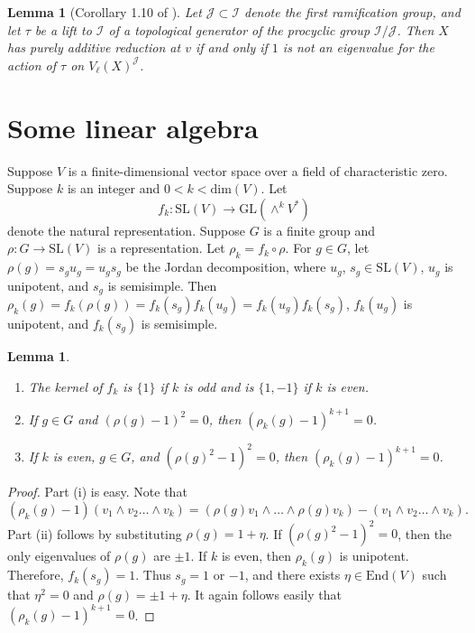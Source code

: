 \documentclass{amsart}
\def\End{\mathrm{End}}
\def\I{{\mathcal I}}
\def\J{{\mathcal J}}
\def\GL{\mathrm{GL}}
\def\SL{\mathrm{SL}}
\def\dim{\mathrm{dim}}
\newtheorem{lem}[thm]{Lemma}
\theoremstyle{definition}
\begin{document}
\begin{lem}[Corollary 1.10 of \cite{LenstraOort}]
\label{padd}
Let $\J \subset \I$ denote the first ramification group,
and let $\tau$ be a lift to $\I$ of a topological generator
of the procyclic group $\I/\J$.
Then $X$ has purely additive reduction at $v$ if and only if 
$1$ is not an eigenvalue for the action of $\tau$ on $V_{\ell}(X)^\J$.
\end{lem}

\section{Some linear algebra}
\label{linalgsect}
Suppose $V$ is a finite-dimensional vector space over a field 
of characteristic zero. 
Suppose $k$ is an integer and $0 < k < \dim(V)$.
Let 
$$f_{k} : \SL(V) \to \GL(\wedge^k V^\ast)$$
denote the natural representation.
Suppose $G$ is a finite group and $\rho:G \to \SL(V)$ is a
representation.
Let $\rho_{k} = f_{k}\circ\rho$.
For $g \in G$, let 
$\rho(g)=s_{g}u_{g} = u_{g}s_{g}$ 
be the Jordan decomposition,
where $u_{g}$, $s_{g} \in \SL(V)$, 
$u_{g}$ is unipotent, and
$s_{g}$ is semisimple.
Then $\rho_{k}(g) = f_k(\rho(g)) =
f_k(s_{g})f_k(u_{g}) = f_k(u_{g})f_k(s_{g})$,
$f_k(u_{g})$ is unipotent, and $f_k(s_{g})$ is semisimple. 

\begin{lem}
\label{lin}
\begin{enumerate}
\item[{(i)}] The kernel of $f_{k}$
is $\{1\}$ if $k$ is odd and is $\{1, -1\}$ if $k$ is even. 
\item[{(ii)}] If $g \in G$ and $(\rho(g)-1)^{2}=0$, then
$(\rho_{k}(g) - 1)^{k+1} = 0$.
\item[{(iii)}] If $k$ is even,
$g \in G$, and $(\rho(g)^{2}-1)^{2}=0$, then
$(\rho_{k}(g) - 1)^{k+1} = 0$.
\end{enumerate} 
\end{lem}

\begin{proof}
Part (i) is easy. 
Note that 
$$(\rho_{k}(g)-1)(v_{1}\wedge v_{2}\ldots \wedge v_{k})
= (\rho(g)v_{1}\wedge\ldots\wedge \rho(g)v_{k}) - 
(v_{1}\wedge v_{2}\ldots \wedge v_{k}).$$
Part (ii) follows by substituting $\rho(g)=1+\eta$.
If $(\rho(g)^{2}-1)^{2}=0$,
then the only eigenvalues
of $\rho(g)$ are $\pm 1$. If $k$ is even, then
$\rho_{k}(g)$ is unipotent. Therefore,
$f_{k}(s_{g})=1$. Thus $s_{g} = 1$ or $-1$, and
there exists $\eta \in \End(V)$ such that
$\eta^2=0$ and $\rho(g) = {\pm}1+\eta$.
It again follows easily that
$(\rho_{k}(g) - 1)^{k+1} = 0$.
\end{proof}
\end{document}
